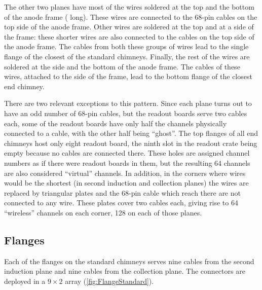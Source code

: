 The other two planes have most of the wires soldered at the top and the bottom of the anode frame
( long).
These wires are connected to the 68-pin cables on the top side of the anode frame.
Other wires are soldered at the top and at a side of the frame:
these shorter wires are also connected to the cables on the top side of the anode frame.
The cables from both these groups of wires lead to the single flange of the closest of the standard chimneys.
Finally, the rest of the wires are soldered at the side and the bottom of the anode frame.
The cables of these wires, attached to the side of the frame,
lead to the bottom flange of the closest end chimney.

There are two relevant exceptions to this pattern.
Since each plane turns out to have an odd number of 68-pin cables,
but the readout boards serve two cables each,
some of the readout boards have only half the channels physically connected to a cable,
with the other half being ``ghost''.
The top flanges of all end chimneys host only eight readout board,
the ninth slot in the readout crate being empty
because no cables are connected there.
These holes are assigned channel numbers as if there were readout boards in them,
but the resulting 64 channels are also considered ``virtual'' channels.
In addition, in the corners where wires would be the shortest
(in second induction and collection planes) the wires are replaced by triangular
plates and the 68-pin cable which reach there are not connected to any wire.
These plates cover two cables each, giving rise to 64 ``wireless'' channels on
each corner, 128 on each of those planes.


\subsection{Flanges}

Each of the flanges on the standard chimneys serves
nine cables from the second induction plane
and nine cables from the collection plane.
The connectors are deployed in a $9 \times 2$ array (\cref{fig:FlangeStandard}).

